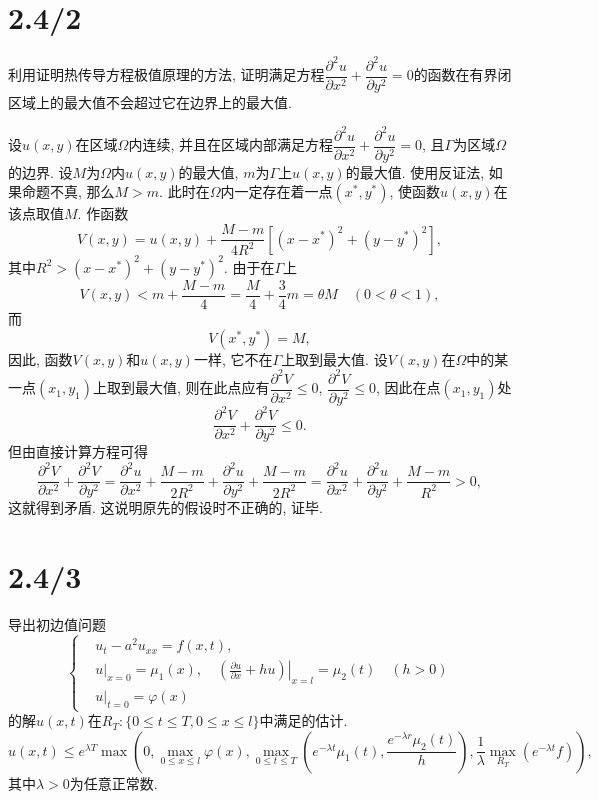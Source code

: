 \documentclass[11pt,a4paper]{article}
\begin{document}
\section{2.4/2}
\begin{problem}
利用证明热传导方程极值原理的方法, 证明满足方程$\dfrac{\partial^2u}{\partial x^2}+\dfrac{\partial^2u}{\partial y^2}=0$的函数在有界闭区域上的最大值不会超过它在边界上的最大值.
\end{problem}

设$u(x,y)$在区域$\Omega$内连续, 并且在区域内部满足方程$\dfrac{\partial^2u}{\partial x^2}+\dfrac{\partial^2u}{\partial y^2}=0$, 且$\Gamma$为区域$\Omega$的边界. 设$M$为$\Omega$内$u(x,y)$的最大值, $m$为$\Gamma$上$u(x,y)$的最大值. 使用反证法, 如果命题不真, 那么$M>m$. 此时在$\Omega$内一定存在着一点$(x^*,y^*)$, 使函数$u(x,y)$在该点取值$M$. 作函数
$$V(x,y)=u(x,y)+\frac{M-m}{4R^2}[(x-x^*)^2+(y-y^*)^2],$$
其中$R^2>(x-x^*)^2+(y-y^*)^2$. 由于在$\Gamma$上
$$V(x,y)<m+\frac{M-m}{4}=\frac{M}{4}+\frac{3}{4}m=\theta M\quad (0<\theta<1),$$
而$$V(x^*,y^*)=M,$$
因此, 函数$V(x,y)$和$u(x,y)$一样, 它不在$\Gamma$上取到最大值. 设$V(x,y)$在$\Omega$中的某一点$(x_1,y_1)$上取到最大值, 则在此点应有$\dfrac{\partial^2 V}{\partial x^2}\leqslant0$, $\dfrac{\partial^2 V}{\partial y^2}\leqslant0$, 因此在点$(x_1,y_1)$处
$$\frac{\partial^2 V}{\partial x^2}+\frac{\partial^2 V}{\partial y^2}\leqslant 0.$$
但由直接计算方程可得
$$\frac{\partial^2 V}{\partial x^2}+\frac{\partial^2 V}{\partial y^2}=\frac{\partial^2 u}{\partial x^2}+\frac{M-m}{2R^2}+\frac{\partial^2 u}{\partial y^2}+\frac{M-m}{2R^2}=\frac{\partial^2 u}{\partial x^2}+\frac{\partial^2 u}{\partial y^2}+\frac{M-m}{R^2}>0,$$
这就得到矛盾. 这说明原先的假设时不正确的, 证毕.

\section{2.4/3}
\begin{problem}
导出初边值问题
$$\left\{\begin{aligned}
     & u_t-a^2u_{xx}=f(x,t),                                                                                        \\
     & u|_{x=0}=\mu_1(x),\quad \left.\left(\frac{\partial u}{\partial x}+hu\right)\right|_{x=l}=\mu_2(t)\quad (h>0) \\
     & u|_{t=0}=\varphi(x)
  \end{aligned}\right.$$
的解$u(x,t)$在$R_T:\{0\leqslant t\leqslant T,0\leqslant x\leqslant l\}$中满足的估计.
$$u(x,t)\leqslant e^{\lambda T}\max\left(0,\max_{0\leqslant x\leqslant l}\varphi(x),\max_{0\leqslant t\leqslant T}\left(e^{-\lambda t}\mu_1(t),\frac{e^{-\lambda r}\mu_2(t)}{h}\right),\frac{1}{\lambda}\max_{R_T}(e^{-\lambda t}f)\right),$$
其中$\lambda>0$为任意正常数.
\end{problem}
\end{document}
